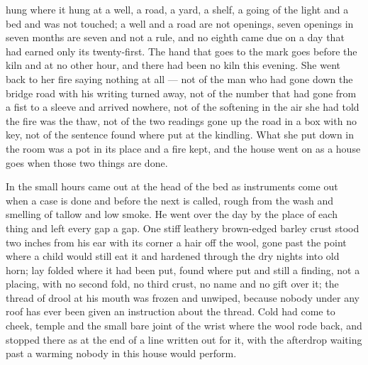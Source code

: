  hung where it hung at a well, a road, a yard, a shelf, a going of the light and a bed and was not touched; a well and a road are not openings, seven openings in seven months are seven and not a rule, and no eighth came due on a day that had earned only its twenty-first. The hand that goes to the mark goes before the kiln and at no other hour, and there had been no kiln this evening. She went back to her fire saying nothing at all --- not of the man who had gone down the bridge road with his writing turned away, not of the number that had gone from a fist to a sleeve and arrived nowhere, not of the softening in the air she had told the fire was the thaw, not of the two readings gone up the road in a box with no key, not of the sentence found where put at the kindling. What she put down in the room was a pot in its place and a fire kept, and the house went on as a house goes when those two things are done.

\scenebreak

In the small hours  came out at the head of the bed as instruments come out when a case is done and before the next is called, rough from the wash and smelling of tallow and low smoke. He went over the day by the place of each thing and left every gap a gap. One stiff leathery brown-edged barley crust stood two inches from his ear with its corner a hair off the wool, gone past the point where a child would still eat it and hardened through the dry nights into old horn;  lay folded where it had been put, found where put and still a finding, not a placing, with no second fold, no third crust, no name and no gift over it; the thread of drool at his mouth was frozen and unwiped, because nobody under any roof has ever been given an instruction about the thread. Cold had come to cheek, temple and the small bare joint of the wrist where the wool rode back, and stopped there as at the end of a line written out for it, with the afterdrop waiting past a warming nobody in this house would perform.

